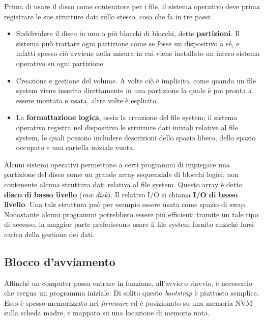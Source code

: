         Prima di usare il disco come contenitore per i file, il sistema operativo deve prima registrare le sue strutture dati sullo stesso, cosa che fa in tre passi:
        \begin{itemize}
            \item Suddividere il disco in uno o più blocchi di blocchi, dette \textbf{partizioni}. Il sistema può trattare ogni partizione come se fosse un dispositivo a sé, e infatti spesso ciò avviene nella misura in cui viene installato un intero sistema operativo su ogni partizione.
            
            \item Creazione e gestione del volume. A volte ciò è implicito, come quando un file system viene inserito direttamente in una partizione la quale è poi pronta a essere montata e usata, altre volte è esplicito.
            
            \item La \textbf{formattazione logica}, ossia la creazione del file system; il sistema operativo registra nel dispositivo le strutture dati iniziali relative al file system, le quali possono includere descrizioni dello spazio libero, dello spazio occupato e una cartella iniziale vuota.
        \end{itemize}
        
        Alcuni sistemi operativi permettono a certi programmi di impiegare una partizione del disco come un grande array sequenziale di blocchi logici, non contenente alcuna struttura dati relativa al file system. Questo array è detto \textbf{disco di basso livello} (\textit{raw disk}). Il relativo I/O si chiama \textbf{I/O di basso livello}. Una tale struttura può per esempio essere usata come spazio di swap. Nonostante alcuni programmi potrebbero essere più efficienti tramite un tale tipo di accesso, la maggior parte preferiscono usare il file system fornito anziché farsi carico della gestione dei dati.
        
    \subsection{Blocco d'avviamento}
        Affinché un computer possa entrare in funzione, all'avvio o riavvio, è necessario che esegua un programma iniziale. Di solito questo \textit{bootstrap} è piuttosto semplice. Esso è spesso memorizzato nel \textit{firmware} ed è posizionato su una memoria NVM sulla scheda madre, e mappato su una locazione di memoria nota.
        
